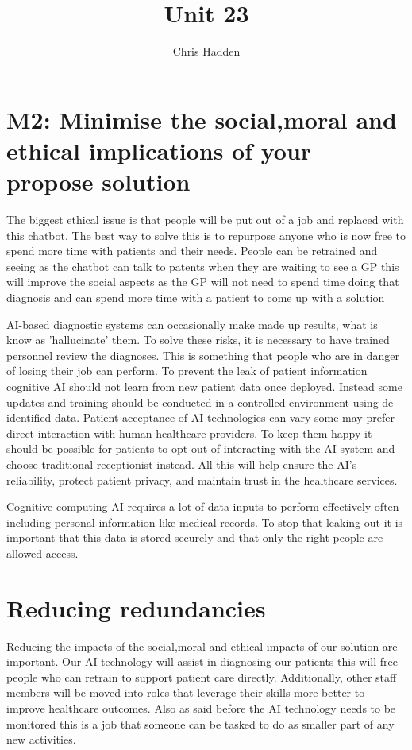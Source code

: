 \documentclass{article}
\title{Unit 23}
\author{Chris Hadden}
\date{}
\begin{document}
\maketitle

\section{M2: Minimise the social,moral and ethical implications of your propose solution}

The biggest ethical issue is that people will be put out of a job and replaced with this chatbot. The best way to solve this is to repurpose anyone who is now free to spend more time with patients and their needs. People can be retrained and seeing as the chatbot can talk to patents when they are waiting to see a GP this will improve the social aspects as the GP will not need to spend time doing that diagnosis and can spend more time with a patient to come up with a solution


AI-based diagnostic systems can occasionally make made up results, what is know as 'hallucinate' them. To solve these risks, it is necessary to have trained personnel review the diagnoses. This is something that people who are in danger of losing their job can perform.
To prevent the leak of patient information cognitive AI should not learn from new patient data once deployed. Instead some updates and training should be conducted in a controlled environment using de-identified data.
Patient acceptance of AI technologies can vary some may prefer direct interaction with human healthcare providers. To keep them happy it should be possible for patients to opt-out of interacting with the AI system and choose traditional receptionist instead. 
All this will help ensure the AI's reliability, protect patient privacy, and maintain trust in the healthcare services.


Cognitive computing AI requires a lot of data inputs to perform effectively often including personal information like medical records. To stop that leaking out it is important that this data is stored securely and that only the right people are allowed access.

\section{Reducing redundancies}
Reducing the impacts of the social,moral and ethical impacts of our solution are important.
Our AI technology will assist in diagnosing our patients this will free people who can retrain to support patient care directly. Additionally, other staff members will be moved into roles that leverage their skills more better to improve healthcare outcomes. Also as said before the AI technology needs to be monitored this is a job that someone can be tasked to do as smaller part of any new activities.
\end{document}
